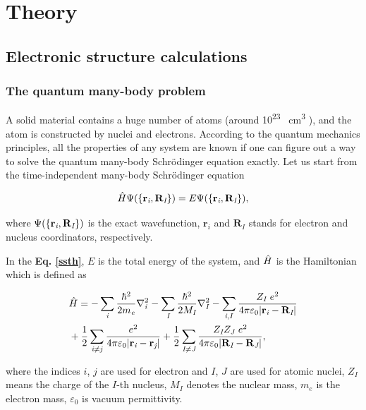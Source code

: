 \documentclass[a4paper, 12pt, titlepage,oneside,drop]{kthesis}
\begin{document}
\chapter{Theory}

\section{Electronic structure calculations }
\label{ch:dft}

\subsection{The quantum many-body problem}
\label{ch:mb}

\noindent A solid material contains a huge number of atoms (around 10\textsuperscript{23} \si{\per\cubic\centi\metre} ), and the atom is constructed by nuclei and electrons. 
According to the quantum mechanics principles, all the properties of any system are known if one can figure out a way to solve 
the quantum many-body Schrödinger equation exactly. Let us start from the time-independent many-body Schrödinger equation

\begin{equation}\label{ssth}
 {\hat{H}} {\Psi(\{ {\textbf r}_{\textit i}, {\textbf R}_{\textit I} \})} = {E} {\Psi(\{ {\textbf r}_{\textit i}, {\textbf R}_{\textit I} \})},
\end{equation}

where $\Psi(\{ {\textbf r}_{\textit i}, {\textbf R}_{\textit I} \})$  is the exact wavefunction, $\textbf{r}_\textit{i}$ and $\textbf{R}_\textit{I}$  stands for electron and
nucleus coordinators, respectively.

In the \textbf{Eq. \ref{ssth}}, $E$ is the total energy of the system, and $\hat{H}$ is the Hamiltonian which is defined as

\begin{equation}\label{th}
\begin{split}
& \hath = - \sumi<i> {\frac{\hbar^{2}}{2 m_{\textit e}}}   \nablaia<i> - \sumi<I> {\frac{\hbar^{2}}{2 M_\textit{I}}} \nablaia<I>  - \sumij<i><I> \frac{Z_\textit{I}\ e^2}{4 \pi \varepsilon_0 |\textbf{r}_\textit{i}-\textbf{R}_\textit{I}|} \\
& + \frac{1}{2} \suminj<i><j> \frac{ e^2}{4 \pi \varepsilon_0 |\textbf{r}_\textit{i}-\textbf{r}_\textit{j}|} + \frac{1}{2} \suminj<I><J> \frac{Z_\textit{I} Z_\textit{J}\  e^2}{4 \pi \varepsilon_0 |\textbf{R}_\textit{I}-\textbf{R}_\textit{J}|},
\end{split}
\end{equation}

where the indices $\textit{i}$, $\textit{j}$ are used for electron and $\textit{I}$, $\textit{J}$ are used for atomic nuclei, $Z_\textit{I}$ means the charge of the $\textit{I}$-th nucleus,
$\textit{M}_I$ denotes the nuclear mass, $m_e$ is the electron mass, $\varepsilon_0$ is vacuum permittivity.
\end{document}
